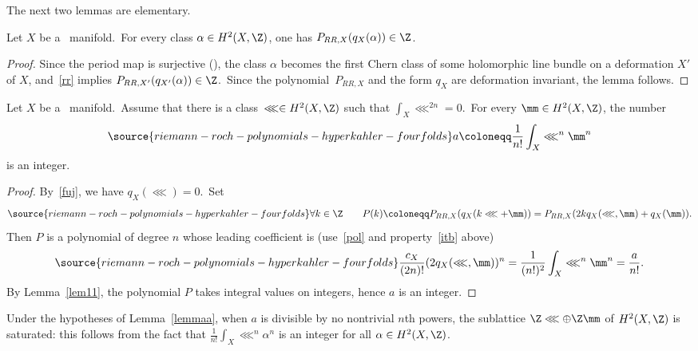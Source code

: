 The next two lemmas are elementary.

\begin{lemm}\label{lem11}
Let $X$ be a \hk\ manifold.\ For every class $\alpha\in H^2(X,\Z)$, one has $P_{RR,X}(q_X(\alpha))\in\Z$.
\end{lemm}

\begin{proof}
Since the period map is surjective (\cite[Proposition~25.12]{huy}), the class $\alpha$ becomes the first Chern class of some holomorphic line bundle on a deformation $X'$ of $X$, and~\eqref{rr} implies $P_{RR,X'}(q_{X'}(\alpha))\in \Z$.\ Since the polynomial~$P_{RR,X} $ and the form $q_X$ are deformation invariant, the lemma follows.
\end{proof}

\begin{lemm}\label{lemmaa}
Let $X$ be a \hk\ manifold.\ Assume   that there is a  class~$\lll \in H^2(X,\Z)$ such that $\int_X \lll^{2n}=0$.\ For every $ \mm\in H^2(X,\Z)$, the number
\begin{equation}\label{defa2}
\source{riemann-roch-polynomials-hyperkahler-fourfolds}
a\coloneqq \frac{1}{n!}\int_X \lll^{n}\mm^{n}
\end{equation}
is  an integer.
\end{lemm}

\begin{proof}
By~\eqref{fuj}, we have $q_X(\lll)=0$.\ Set
\begin{equation}\label{defP}
\source{riemann-roch-polynomials-hyperkahler-fourfolds}
\forall k\in \Z\qquad P(k)\coloneqq P_{RR,X}(q_X(k\lll+ \mm))=P_{RR,X}(2kq_X(\lll,\mm)+q_X(\mm)) .
\end{equation}
Then $P$ is a  polynomial of degree $n$ whose leading coefficient is  (use~\eqref{pol} and property~\ref{itb} above)
\begin{equation}\label{defia}
\source{riemann-roch-polynomials-hyperkahler-fourfolds}
\frac{c_X}{(2n)!} (2 q_X(\lll,\mm))^n=\frac{1}{(n!)^2}\int_X \lll^{n}\mm^{n}=\frac{a}{n!}.
\end{equation}
By Lemma~\ref{lem11}, the polynomial $P$ takes integral values on integers, hence $a$ is  an integer.
\end{proof}


\begin{rema}
\notready\label{prim}
Under the hypotheses of Lemma~\ref{lemmaa}, when $a$ is    divisible by no nontrivial $n$th powers, the sublattice $\Z\lll\oplus \Z\mm$ of $H^2(X,\Z)$ is saturated: this follows from the fact that  $\frac{1}{n!}\int_X \lll^{n}\alpha^{n}$ is an integer for all $\alpha\in H^2(X,\Z)$.
\end{rema}




